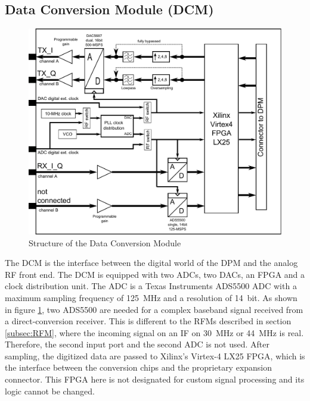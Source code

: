 \subsection{Data Conversion Module (DCM)}
\begin{figure}[tbp]
	\centering
		\includegraphics[width=1.00\textwidth]{../kapitel03/figures/Data_Conversion_Modul.pdf}
	\caption{Structure of the Data Conversion Module}
	\label{fig:Data_Conversion_Modul}
\end{figure}

The \ac{DCM} is the interface between the digital world of the \ac{DPM} and the analog RF front end. The DCM is equipped with two \acp{ADC}, two \acp{DAC}, an \ac{FPGA} and a clock distribution unit. The \ac{ADC} is a Texas Instruments ADS5500 \acl{ADC} \cite{ads5500} with a maximum sampling frequency of \SI{125}{MHz} and a resolution of \SI{14}{bit}. As shown in figure \ref{fig:Data_Conversion_Modul}, two ADS5500 are needed for a complex baseband signal received from a direct-conversion receiver. This is different to the \acp{RFM} described in section \ref{subsec:RFM}, where the incoming signal on an \ac{IF} on \SI{30}{MHz} or \SI{44}{MHz} is real. Therefore, the second input port and the second \ac{ADC} is not used. After sampling, the digitized data are passed to Xilinx's Virtex-4 LX25 \ac{FPGA}, which is the interface between the conversion chips and the proprietary expansion connector. This \ac{FPGA} here is not designated for custom signal processing and its logic cannot be changed.

